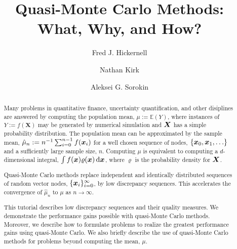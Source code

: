 \documentclass{svproc}
\begin{document}
\mainmatter              %
%
\title{Quasi-Monte Carlo Methods:  What, Why, and How?}
%
%
\author{Fred J. Hickernell \and Nathan Kirk \and Aleksei G. Sorokin}
%
%
%



\maketitle              %

\begin{abstract}
Many problems in  quantitative finance, uncertainty quantification, and other disiplines are answered by computing the population mean, $\mu := \mathbb{E}(Y)$, where instances of $Y:=f(\boldsymbol{X})$ may be generated by numerical simulation and ${\boldsymbol{X}}$ has a simple probability  distribution. The population mean can be approximated by the sample mean, $\hat{\mu}_n := n^{-1} \sum_{i=0}^{n-1} f({\boldsymbol{x}}_i)$ for a well chosen sequence of nodes, $\{{\boldsymbol{x}}_0, {\boldsymbol{x}}_1, \ldots\}$ and a sufficiently large sample size, $n$.  Computing $\mu$ is equivalent to computing a $d$-dimensional integral, $\int f({\boldsymbol{x}}) \varrho({\boldsymbol{x}}) \, \mathrm{d} {\boldsymbol{x}}$, where $\varrho$ is the probability density for ${\boldsymbol{X}}$.

Quasi-Monte Carlo methods replace independent and identically distributed  sequences of random vector nodes, $\{{\boldsymbol{x}}_i \}_{i = 0}^{\infty}$, by low discrepancy sequences.  This accelerates the convergence of $\hat{\mu}_n$ to $\mu$ as $n \to \infty$.

This tutorial describes  low discrepancy sequences  and their quality measures.  We demonstrate the performance gains possible with quasi-Monte Carlo methods.  Moreover, we describe how to formulate problems to realize the greatest performance gains using quasi-Monte Carlo.  We also briefly describe the use of quasi-Monte Carlo methods for problems beyond computing the mean, $\mu$.

\end{abstract}
%
\setcounter{tocdepth}{2}
\end{document}
